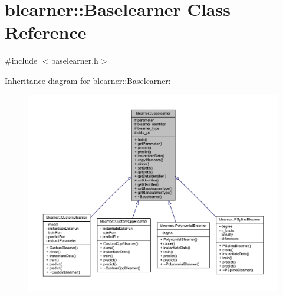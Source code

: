 \hypertarget{classblearner_1_1_baselearner}{}\section{blearner\+:\+:Baselearner Class Reference}
\label{classblearner_1_1_baselearner}


{\ttfamily \#include $<$baselearner.\+h$>$}



Inheritance diagram for blearner\+:\+:Baselearner\+:
\nopagebreak
\begin{figure}[H]
\begin{center}
\leavevmode
\includegraphics[width=350pt]{classblearner_1_1_baselearner__inherit__graph}
\end{center}
\end{figure}


